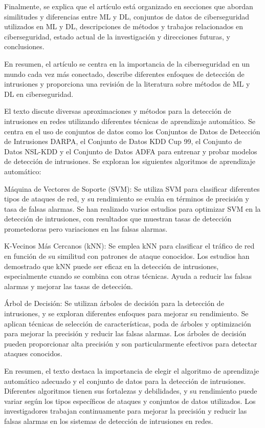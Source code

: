 \documentclass[11pt, a4paper]{article} %
\begin{document}
Finalmente, se explica que el artículo está organizado en secciones que abordan similitudes y diferencias entre ML y DL, conjuntos de datos de ciberseguridad utilizados en ML y DL, descripciones de métodos y trabajos relacionados en ciberseguridad, estado actual de la investigación y direcciones futuras, y conclusiones.

En resumen, el artículo se centra en la importancia de la ciberseguridad en un mundo cada vez más conectado, describe diferentes enfoques de detección de intrusiones y proporciona una revisión de la literatura sobre métodos de ML y DL en ciberseguridad.


El texto discute diversas aproximaciones y métodos para la detección de intrusiones en redes utilizando diferentes técnicas de aprendizaje automático. Se centra en el uso de conjuntos de datos como los Conjuntos de Datos de Detección de Intrusiones DARPA, el Conjunto de Datos KDD Cup 99, el Conjunto de Datos NSL-KDD y el Conjunto de Datos ADFA para entrenar y probar modelos de detección de intrusiones. Se exploran los siguientes algoritmos de aprendizaje automático:

Máquina de Vectores de Soporte (SVM): Se utiliza SVM para clasificar diferentes tipos de ataques de red, y su rendimiento se evalúa en términos de precisión y tasa de falsas alarmas. Se han realizado varios estudios para optimizar SVM en la detección de intrusiones, con resultados que muestran tasas de detección prometedoras pero variaciones en las falsas alarmas.

K-Vecinos Más Cercanos (kNN): Se emplea kNN para clasificar el tráfico de red en función de su similitud con patrones de ataque conocidos. Los estudios han demostrado que kNN puede ser eficaz en la detección de intrusiones, especialmente cuando se combina con otras técnicas. Ayuda a reducir las falsas alarmas y mejorar las tasas de detección.

Árbol de Decisión: Se utilizan árboles de decisión para la detección de intrusiones, y se exploran diferentes enfoques para mejorar su rendimiento. Se aplican técnicas de selección de características, poda de árboles y optimización para mejorar la precisión y reducir las falsas alarmas. Los árboles de decisión pueden proporcionar alta precisión y son particularmente efectivos para detectar ataques conocidos.

En resumen, el texto destaca la importancia de elegir el algoritmo de aprendizaje automático adecuado y el conjunto de datos para la detección de intrusiones. Diferentes algoritmos tienen sus fortalezas y debilidades, y su rendimiento puede variar según los tipos específicos de ataques y conjuntos de datos utilizados. Los investigadores trabajan continuamente para mejorar la precisión y reducir las falsas alarmas en los sistemas de detección de intrusiones en redes.
\end{document}
